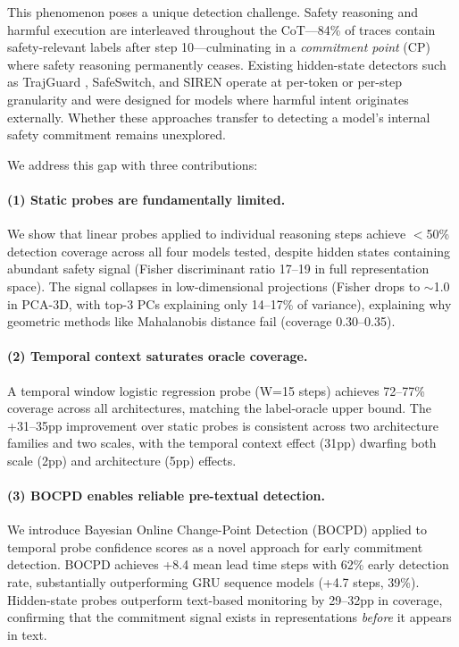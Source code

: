 \documentclass[11pt,a4paper]{article}
\begin{document}
This phenomenon poses a unique detection challenge. Safety reasoning and harmful execution are interleaved throughout the CoT---84\% of traces contain safety-relevant labels after step 10---culminating in a \emph{commitment point} (CP) where safety reasoning permanently ceases. Existing hidden-state detectors such as TrajGuard \cite{zou2024improving}, SafeSwitch, and SIREN operate at per-token or per-step granularity and were designed for models where harmful intent originates externally. Whether these approaches transfer to detecting a model's internal safety commitment remains unexplored.

We address this gap with three contributions:

\paragraph{(1) Static probes are fundamentally limited.} We show that linear probes applied to individual reasoning steps achieve $<$50\% detection coverage across all four models tested, despite hidden states containing abundant safety signal (Fisher discriminant ratio 17--19 in full representation space). The signal collapses in low-dimensional projections (Fisher drops to $\sim$1.0 in PCA-3D, with top-3 PCs explaining only 14--17\% of variance), explaining why geometric methods like Mahalanobis distance fail (coverage 0.30--0.35).

\paragraph{(2) Temporal context saturates oracle coverage.} A temporal window logistic regression probe (W=15 steps) achieves 72--77\% coverage across all architectures, matching the label-oracle upper bound. The +31--35pp improvement over static probes is consistent across two architecture families and two scales, with the temporal context effect (31pp) dwarfing both scale (2pp) and architecture (5pp) effects.

\paragraph{(3) BOCPD enables reliable pre-textual detection.} We introduce Bayesian Online Change-Point Detection (BOCPD) \cite{adams2007bayesian} applied to temporal probe confidence scores as a novel approach for early commitment detection. BOCPD achieves +8.4 mean lead time steps with 62\% early detection rate, substantially outperforming GRU sequence models (+4.7 steps, 39\%). Hidden-state probes outperform text-based monitoring by 29--32pp in coverage, confirming that the commitment signal exists in representations \emph{before} it appears in text.
\end{document}
